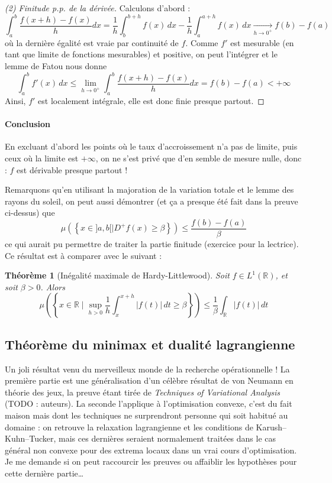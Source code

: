 \documentclass[a4paper, 11pt]{article}
\def\R{\mathbb{R}}
\newtheorem*{theorem}{Théorème}
\begin{document}
\begin{proof}[(2) Finitude p.p. de la dérivée]
Calculons d'abord :
\[
  \int_a^b \frac{f(x+h) - f(x)}{h}dx =
    \frac{1}{h} \int_b^{b+h} f(x)\,dx - \frac{1}{h} \int_a^{a+h} f(x)\,dx
    \underset{h \to 0^+}{\longrightarrow} f(b) - f(a)
\]
où la dernière égalité est vraie par continuité de $f$. Comme $f'$ est mesurable
(en tant que limite de fonctions mesurables) et positive, on peut l'intégrer et
le lemme de Fatou nous donne
\[ \int_a^b f'(x)\,dx \leq \lim_{h \to 0^+} \int_a^b \frac{f(x+h) - f(x)}{h}dx =
  f(b)- f(a) < +\infty \] 
Ainsi, $f'$ est localement intégrale, elle est donc finie presque partout.
\end{proof}

\paragraph{Conclusion} En excluant d'abord les points où le taux d'accroissement
n'a pas de limite, puis ceux où la limite est $+\infty$, on ne s'est privé que
d'en semble de mesure nulle, donc : $f$ est dérivable presque partout !

Remarquons qu'en utilisant la majoration de la variation totale et le lemme des
rayons du soleil, on peut aussi démontrer (et ça a presque été fait dans la
preuve ci-dessus) que
\[ \mu\left( \left\{ x \in ]a,b[ \mid D^+f(x) \geq \beta \right\} \right)
  \leq \frac{f(b)-f(a)}{\beta} \]
ce qui aurait pu permettre de traiter la partie finitude (exercice pour la
lectrice). Ce résultat est à comparer avec le suivant :
\begin{theorem}[Inégalité maximale de Hardy-Littlewood]
  Soit $f \in L^1(\R)$, et soit $\beta > 0$. Alors
  \[ \mu\left( \left\{ x \in \R \mid \sup_{h > 0} \frac{1}{h} \int_x^{x+h}
        |f(t)|\,dt \geq \beta \right\} \right)
    \leq \frac{1}{\beta} \int_\R |f(t)|\,dt \]
\end{theorem}


\subsection{Théorème du minimax et dualité lagrangienne}

Un joli résultat venu du merveilleux monde de la recherche opérationnelle ! La
première partie est une généralisation d'un célèbre résultat de von Neumann en
théorie des jeux, la preuve étant tirée de \emph{Techniques of Variational
  Analysis} (TODO : auteurs). La seconde l'applique à l'optimisation convexe,
c'est du fait maison mais dont les techniques ne surprendront personne qui soit
habitué au domaine : on retrouve la relaxation lagrangienne et les conditions de
Karush--Kuhn--Tucker, mais ces dernières seraient normalement traitées dans le
cas général non convexe pour des extrema locaux dans un vrai cours
d'optimisation. Je me demande si on peut raccourcir les preuves ou affaiblir les
hypothèses pour cette dernière partie…
\end{document}
